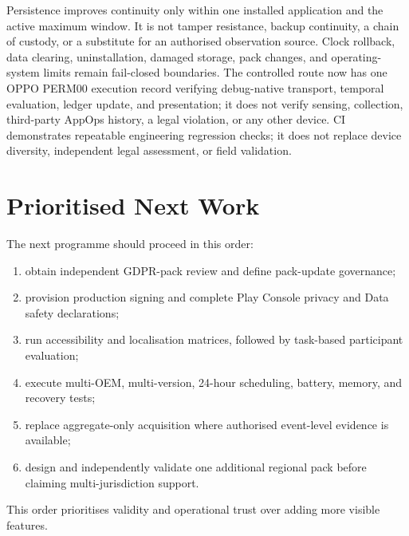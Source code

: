 Persistence improves continuity only within one installed application and the active maximum window. It is not tamper resistance, backup continuity, a chain of custody, or a substitute for an authorised observation source. Clock rollback, data clearing, uninstallation, damaged storage, pack changes, and operating-system limits remain fail-closed boundaries. The controlled route now has one OPPO PERM00 execution record verifying debug-native transport, temporal evaluation, ledger update, and presentation; it does not verify sensing, collection, third-party AppOps history, a legal violation, or any other device. CI demonstrates repeatable engineering regression checks; it does not replace device diversity, independent legal assessment, or field validation.

\section{Prioritised Next Work}

The next programme should proceed in this order:

\begin{enumerate}
    \item obtain independent GDPR-pack review and define pack-update governance;
    \item provision production signing and complete Play Console privacy and Data safety declarations;
    \item run accessibility and localisation matrices, followed by task-based participant evaluation;
    \item execute multi-OEM, multi-version, 24-hour scheduling, battery, memory, and recovery tests;
    \item replace aggregate-only acquisition where authorised event-level evidence is available;
    \item design and independently validate one additional regional pack before claiming multi-jurisdiction support.
\end{enumerate}

This order prioritises validity and operational trust over adding more visible features.


